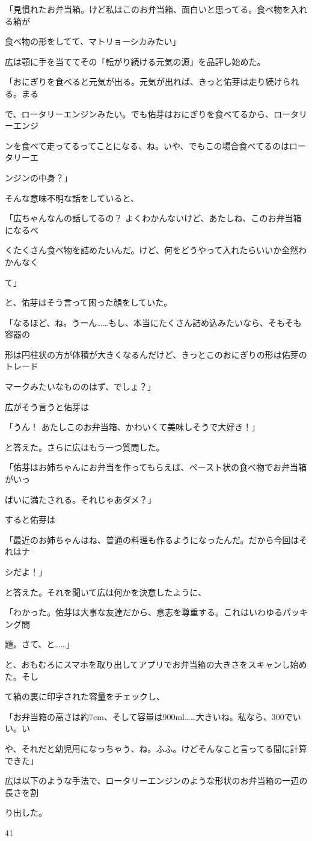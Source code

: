 「⾒慣れたお弁当箱。けど私はこのお弁当箱、⾯⽩いと思ってる。⾷べ物を⼊れる箱が\par
⾷べ物の形をしてて、マトリョーシカみたい」\par
広は顎に⼿を当ててその「転がり続ける元気の源」を品評し始めた。\par
「おにぎりを⾷べると元気が出る。元気が出れば、きっと佑芽は⾛り続けられる。まる\par
で、ロータリーエンジンみたい。でも佑芽はおにぎりを⾷べてるから、ロータリーエンジ\par
ンを⾷べて⾛ってるってことになる、ね。いや、でもこの場合⾷べてるのはロータリーエ\par
ンジンの中⾝？」\par
そんな意味不明な話をしていると、\par
「広ちゃんなんの話してるの？ よくわかんないけど、あたしね、このお弁当箱になるべ\par
くたくさん⾷べ物を詰めたいんだ。けど、何をどうやって⼊れたらいいか全然わかんなく\par
て」\par
と、佑芽はそう⾔って困った顔をしていた。\par
「なるほど、ね。うーん……もし、本当にたくさん詰め込みたいなら、そもそも容器の\par
形は円柱状の⽅が体積が⼤きくなるんだけど、きっとこのおにぎりの形は佑芽のトレード\par
マークみたいなもののはず、でしょ？」\par
広がそう⾔うと佑芽は\par
「うん！ あたしこのお弁当箱、かわいくて美味しそうで⼤好き！」\par
と答えた。さらに広はもう⼀つ質問した。\par
「佑芽はお姉ちゃんにお弁当を作ってもらえば、ペースト状の⾷べ物でお弁当箱がいっ\par
ぱいに満たされる。それじゃあダメ？」\par
すると佑芽は\par
「最近のお姉ちゃんはね、普通の料理も作るようになったんだ。だから今回はそれはナ\par
シだよ！」\par
と答えた。それを聞いて広は何かを決意したように、\par
「わかった。佑芽は⼤事な友達だから、意志を尊重する。これはいわゆるパッキング問\par
題。さて、と……」\par
と、おもむろにスマホを取り出してアプリでお弁当箱の⼤きさをスキャンし始めた。そし\par
て箱の裏に印字された容量をチェックし、\par
「お弁当箱の⾼さは約7cm、そして容量は900ml……⼤きいね。私なら、300でいい。い\par
や、それだと幼児⽤になっちゃう、ね。ふふ。けどそんなこと⾔ってる間に計算できた」\par
広は以下のような⼿法で、ロータリーエンジンのような形状のお弁当箱の⼀辺の長さを割\par
り出した。\par
41\par

